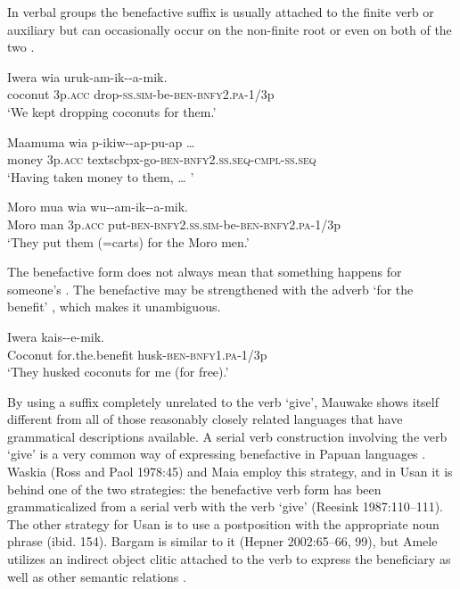 In verbal groups the benefactive suffix is usually attached to the finite verb or auxiliary  but can occasionally occur on the non-finite root  or even on both of the two .

\ea%
\label{ex:3:x212}
\gll Iwera wia uruk-am-ik--a-mik. \\
coconut 3p.\textsc{acc} drop-\textsc{ss}.\textsc{sim}-be-\textsc{ben}-\textsc{bnfy}2.\textsc{pa}-1/3p\\
\glt`We kept dropping coconuts for them.' 
\z

\ea%
\label{ex:3:x213}
\gll Maamuma wia p-ikiw--ap-pu-ap {\dots} \\
money 3p.\textsc{acc} textsc{bpx}-go-\textsc{ben}-\textsc{bnfy}2.\textsc{ss}.\textsc{seq}-\textsc{cmpl}-\textsc{ss}.\textsc{seq} \\
\glt`Having taken money to them, {\dots} '
\z

\ea%
\label{ex:3:x214}
\gll Moro mua wia wu--am-ik--a-mik. \\
Moro man 3p.\textsc{acc} put-\textsc{ben}-\textsc{bnfy}2.\textsc{ss}.\textsc{sim}-be-\textsc{ben}-\textsc{bnfy}2.\textsc{pa}-1/3p\\
\glt`They put them (=carts) for the Moro men.' 
\z

The benefactive form does not always mean that something happens for someone's\textstyleEmphasizedWords{} . The benefactive may be strengthened with the adverb  `for the benefit' , which makes it unambiguous.

\ea%
\label{ex:3:x215}
\gll Iwera  kais--e-mik. \\
Coconut for.the.benefit husk-\textsc{ben}-\textsc{bnfy}1.\textsc{pa}-1/3p \\
\glt`They husked coconuts for me (for free).'
\z

By using a suffix completely unrelated to the verb `give', Mauwake shows itself different from all of those reasonably closely related languages that have grammatical descriptions available. A serial verb construction involving the verb `give' is a very common way of expressing benefactive in Papuan languages \citep[141]{Foley1986}. Waskia ({Ross and Paol 1978}:45) and Maia \citep[125]{Hardin2002} employ this strategy, and in Usan it is behind one of the two strategies: the benefactive verb form has been grammaticalized from a serial verb with the verb `give' ({Reesink 1987}:110--111). The other strategy for Usan is to use a postposition with the appropriate noun phrase (ibid. 154). Bargam is similar to it ({Hepner 2002}:65--66, 99), but Amele utilizes an indirect object clitic attached to the verb to express the beneficiary as well as other semantic relations \citep[167]{Roberts1987}. 


